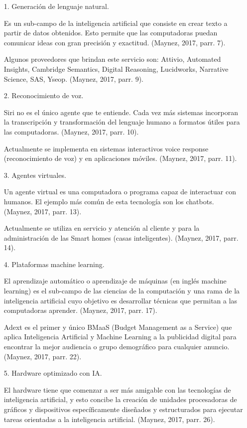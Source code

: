 \begin{itemize}
\item[1.]Generación de lenguaje natural.

Es un sub-campo de la inteligencia artificial que consiste en crear texto a partir de datos obtenidos. Esto permite que las computadoras puedan comunicar ideas con gran precisión y exactitud. (Maynez, 2017, parr. 7).

Algunos proveedores que brindan este servicio son: Attivio, Automated Insights, Cambridge Semantics, Digital Reasoning, Lucidworks, Narrative Science, SAS, Yseop. (Maynez, 2017, parr. 9).

\item[2.]Reconocimiento de voz.

Siri no es el único agente que te entiende. Cada vez más sistemas incorporan la transcripción y transformación del lenguaje humano a formatos útiles para las computadoras. (Maynez, 2017, parr. 10).

Actualmente se implementa en sistemas interactivos voice response (reconocimiento de voz) y en aplicaciones móviles. (Maynez, 2017, parr. 11).

\item[3.]Agentes virtuales.

Un agente virtual es una computadora o programa capaz de interactuar con humanos. El ejemplo más común de esta tecnología son los chatbots. (Maynez, 2017, parr. 13).

Actualmente se utiliza en servicio y atención al cliente y para la administración de las Smart homes (casas inteligentes). (Maynez, 2017, parr. 14).

\item[4.]Plataformas machine learning.
 
El aprendizaje automático o aprendizaje de máquinas (en inglés machine learning) es el sub-campo de las ciencias de la computación y una rama de la inteligencia artificial cuyo objetivo es desarrollar técnicas que permitan a las computadoras aprender. (Maynez, 2017, parr. 17).

Adext es el primer y único BMaaS (Budget Management as a Service) que aplica Inteligencia Artificial y Machine Learning a la publicidad digital para encontrar la mejor audiencia o grupo demográfico para cualquier anuncio. (Maynez, 2017, parr. 22).

\item[5.]Hardware optimizado con IA.

El hardware tiene que comenzar a ser más amigable con las tecnologías de inteligencia artificial, y esto concibe la creación de unidades procesadoras de gráficos y dispositivos específicamente diseñados y estructurados para ejecutar tareas orientadas a la inteligencia artificial. (Maynez, 2017, parr. 26).

\end{itemize}

